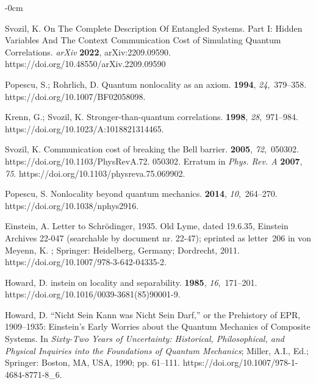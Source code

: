 \documentclass[entropy,article,accept,oneauthor,pdftex]{Definitions/mdpi}
\begin{document}
\begin{adjustwidth}{-\extralength}{0cm}
\begin{thebibliography}{999}
Svozil, K.
\newblock On The Complete Description Of Entangled Systems. {P}art {I}:
  {H}idden Variables And The Context Communication Cost of Simulating Quantum
  Correlations. \emph{arXiv}  \textbf{2022}, arXiv:2209.09590.
\newblock
  {https://doi.org/10.48550/arXiv.2209.09590}


Popescu, S.; Rohrlich, D.
\newblock Quantum nonlocality as an axiom.
 {\bf 1994}, {\em 24},~379--358.
\newblock
  {https://doi.org/10.1007/BF02058098}.

Krenn, G.; Svozil, K.
\newblock Stronger-than-quantum correlations.
 {\bf 1998}, {\em 28},~971--984.
\newblock
  {https://doi.org/10.1023/A:1018821314465}.

Svozil, K.
\newblock Communication cost of breaking the {B}ell barrier.
 {\bf 2005}, {\em 72},~050302.
\newblock
  {https://doi.org/10.1103/PhysRevA.72. 050302}.
\newblock Erratum in
 {\em Phys. Rev. A} {\bf 2007}, {\em 75}.
\newblock
  {https://doi.org/10.1103/physreva.75.069902}.

Popescu, S.
\newblock Nonlocality beyond quantum mechanics.
 {\bf 2014}, {\em 10},~264--270.
\newblock
  {https://doi.org/10.1038/nphys2916}.

Einstein, A.
\newblock Letter to {S}chr\"odinger,  1935.
\newblock Old Lyme, dated 19.6.35, Einstein Archives 22-047 (searchable by
  document nr. 22-47); eprinted as letter~206 in
{von Meyenn}, K.
; Springer: Heidelberg, Germany; Dordrecht, 2011.
\newblock
  {https://doi.org/10.1007/978-3-642-04335-2}.

Howard, D.
instein on locality and separability.
 {\bf 1985},
  {\em 16},~171--201.
\newblock
  {https://doi.org/10.1016/0039-3681(85)90001-9}.

Howard, D.
\newblock ``{N}icht Sein Kann was Nicht Sein Darf,'' or the Prehistory of
  {EPR}, 1909--1935: {E}instein's Early Worries about the Quantum Mechanics of
  Composite Systems.
\newblock  In \emph{Sixty-Two Years of Uncertainty: Historical, Philosophical, and
  Physical Inquiries into the Foundations of Quantum Mechanics}; Miller, A.I.,
  Ed.; Springer: Boston, MA, USA, 1990; pp. 61--111.
\newblock
  {https://doi.org/10.1007/978-1-4684-8771-8\_6}.


\end{thebibliography}
\end{adjustwidth}
\end{document}
